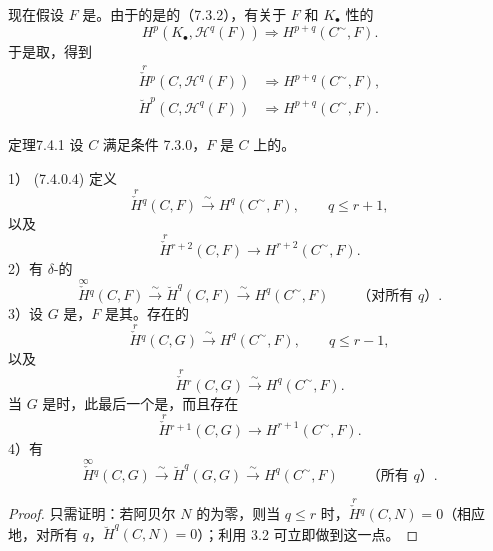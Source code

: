 现在假设 $F$ 是。由于的是的（7.3.2），有关于 $F$ 和 $K_\bullet$ 性的
\begin{equation}H^p(K_\bullet,\mathscr H^q(F))\Longrightarrow H^{p+q}(C^{\sim},F).\tag{7.4.0.3}\end{equation}
于是取，得到
\begin{equation}\begin{aligned}\overset{r}{\check H}{}^p(C,\mathscr H^q(F))&\Longrightarrow H^{p+q}(C^{\sim},F),\\
\breve H^p(C,\mathscr H^q(F))&\Longrightarrow H^{p+q}(C^{\sim},F).
\end{aligned}\tag{7.4.0.4}\end{equation}
\begin{SGAresult}{定理}{7.4.1}
设 $C$ 满足条件 7.3.0，$F$ 是 $C$ 上的。

1） (7.4.0.4) 定义
\[\overset{r}{\check H}{}^q(C,F)\xrightarrow{\sim}H^q(C^{\sim},F),\qquad q\leq r+1,\]
以及
\[\overset{r}{\check H}{}^{r+2}(C,F)\longrightarrow H^{r+2}(C^{\sim},F).\]
2）有 $\delta$-的
\[\overset{\infty}{\check H}{}^q(C,F)\xrightarrow{\sim}\breve H^q(C,F)\xrightarrow{\sim}H^q(C^{\sim},F)\qquad\text{（对所有 $q$）}.\]
3）设 $G$ 是，$F$ 是其。存在的
\[\overset{r}{\check H}{}^q(C,G)\xrightarrow{\sim}H^q(C^{\sim},F),\qquad q\leq r-1,\]
以及
\[\overset{r}{\check H}{}^r(C,G)\xrightarrow{\sim}H^q(C^{\sim},F).\]
当 $G$ 是时，此最后一个是，而且存在
\[\overset{r}{\check H}{}^{r+1}(C,G)\longrightarrow H^{r+1}(C^{\sim},F).\]
4）有
\[\overset{\infty}{\check H}{}^q(C,G)\xrightarrow{\sim}\breve H^q(G,G)\xrightarrow{\sim}H^q(C^{\sim},F)\qquad\text{（所有 $q$）}.\]
\end{SGAresult}
\begin{proof}只需证明：若阿贝尔 $N$ 的为零，则当 $q\leq r$ 时，$\overset{r}{\check H}{}^q(C,N)=0$（相应地，对所有 $q$，$\breve H^q(C,N)=0$）；利用 3.2 可立即做到这一点。\end{proof}
